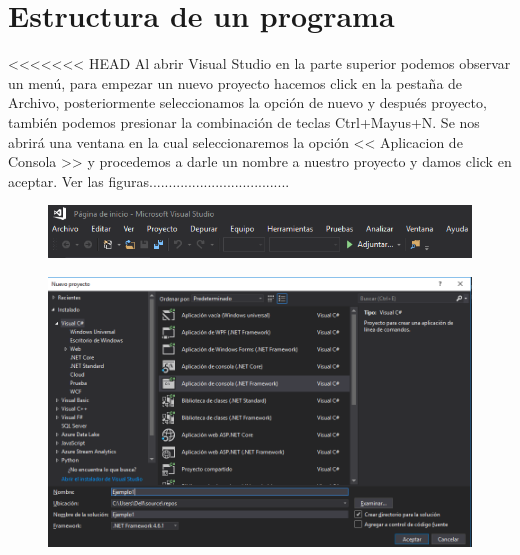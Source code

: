 \documentclass[12pt,a4paper]{report}
\begin{document}
\section{Estructura de un programa}
<<<<<<< HEAD
Al abrir Visual Studio en la parte superior podemos observar un menú, para empezar un nuevo proyecto hacemos click en la pestaña de Archivo, posteriormente seleccionamos la opción de nuevo y después proyecto, también podemos presionar la combinación de teclas Ctrl+Mayus+N. Se nos abrirá una ventana en la cual seleccionaremos la opción << Aplicacion de Consola >> y procedemos a darle un nombre a nuestro proyecto y damos click en aceptar. Ver las figuras....................................
\begin{figure}[hbtp]
\centering
\includegraphics[width=16cm]{Csh_Imagenes/Menu_sup.png}
\caption{}
\end{figure}
\begin{figure}[hbtp]
\centering
\includegraphics[width=16cm]{Csh_Imagenes/ConsoleApp.png}
\caption{}
\end{figure}
\end{document}
